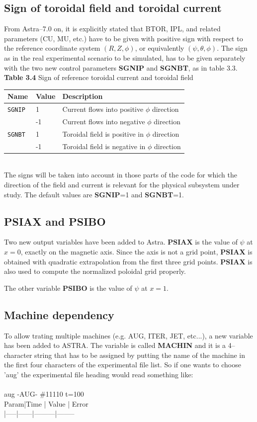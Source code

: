 \subsection{Sign of toroidal field and toroidal current}
From Astra--7.0 on, it is explicitly stated that BTOR, IPL, and related parameters (CU, MU, etc.) have to be given with 
positive sign with respect to the reference coordinate system $(R,Z,\phi)$, or equivalently $(\psi,\theta,\phi)$. The 
sign as in the real experimental scenario to be simulated, has to be given separately with the two new control 
parameters {\bf SGNIP} and {\bf SGNBT}, as in table 3.3.
\\
{\bf Table 3.4} Sign of reference toroidal current and toroidal field\\[2ex]
\begin{tabular}{|l|l|l|}					\hline
\bf Name	&\bf Value & Description\\ \hline
\tt SGNIP 	& 1 & Current flows into positive $\phi$ direction\\
\tt  	& -1 & Current flows into negative $\phi$ direction\\ 
\tt SGNBT 	& 1 & Toroidal field is positive in $\phi$ direction\\
\tt  	& -1 &  Toroidal field is negative in $\phi$ direction\\ 
\hline
\end{tabular}
\bigskip\\
The signs will be taken into account in those parts of the code for which the direction of the field and current is relevant for the physical subsystem under study.
The default values are {\bf SGNIP}=1 and {\bf SGNBT}=1.
%
\subsection{PSIAX and PSIBO}
Two new output variables have been added to Astra. {\bf PSIAX} is the value of 
$\psi$ at $x=0$, exactly on the magnetic axis. Since the axis is not a grid point, 
{\bf PSIAX} is obtained with quadratic extrapolation from the first three grid 
points. {\bf PSIAX} is also used to compute the normalized poloidal grid properly.

The other variable {\bf PSIBO} is the value of $\psi$ at $x=1$.
%
\subsection{Machine dependency}
To allow trating multiple machines (e.g. AUG, ITER, JET, etc...), a new variable has been added to ASTRA.
The variable is called {\bf MACHIN} and it is a 4--character string that has to be assigned by putting the name of the machine in the first four characters of the experimental file list.
So if one wants to choose 'aug' the experimental file heading would read something like:\\\\
aug -AUG- \#11110 t=100 \\
 Param|Time  |  Value  |   Error \\
|-----|------|---------|-------- \\\\


